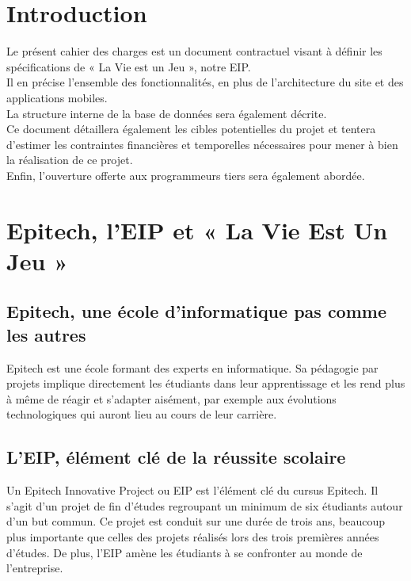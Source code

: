 \documentclass{life-fr}
\begin{document}
\newpage

\tableofcontents



\chapter{Introduction}

Le présent cahier des charges est un document contractuel visant à définir les
spécifications de « La Vie est un Jeu », notre EIP.\\
Il en précise l’ensemble des fonctionnalités, en plus de l’architecture du site et
des applications mobiles.\\
La structure interne de la base de données sera également décrite.\\
Ce document détaillera également les cibles potentielles du projet et tentera
d’estimer les contraintes financières et temporelles nécessaires pour mener à bien
la réalisation de ce projet.\\
Enfin, l’ouverture offerte aux programmeurs tiers sera également abordée.



\chapter{Epitech, l'EIP et « La Vie Est Un Jeu »}

\section{Epitech, une école d'informatique pas comme les autres}

Epitech est une école formant des experts en informatique. Sa pédagogie par projets
implique directement les étudiants dans leur apprentissage et les rend plus à même
de réagir et s'adapter aisément, par exemple aux évolutions technologiques qui
auront lieu au cours de leur carrière.

\section{L'EIP, élément clé de la réussite scolaire}

Un Epitech Innovative Project ou EIP est l'élément clé du cursus Epitech. Il s'agit d'un projet de fin d'études regroupant un minimum de six étudiants autour d'un but commun. Ce projet est conduit sur une durée de trois ans, beaucoup plus importante que celles des projets réalisés lors des trois premières années d'études. De plus, l'EIP amène les étudiants à se confronter au monde de l'entreprise.
\end{document}

